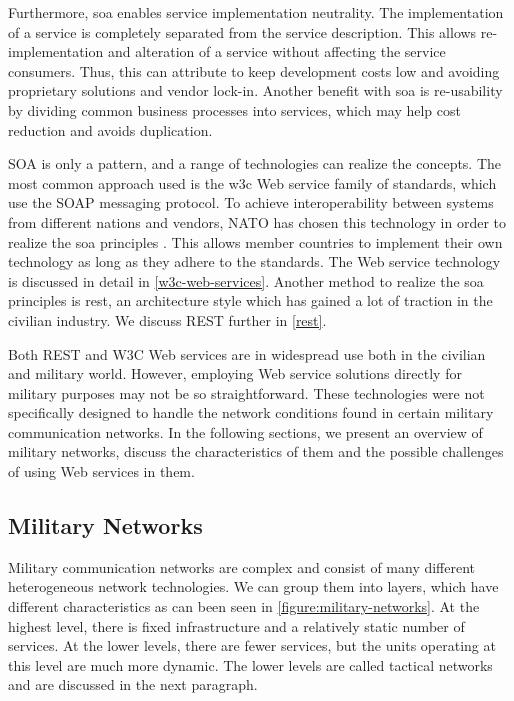 Furthermore, \gls{soa} enables service implementation neutrality. The
implementation of a service is completely separated from the service
description. This allows re-implementation and alteration of a service without
affecting the service consumers. Thus, this can attribute to keep development
costs low and avoiding proprietary solutions and vendor lock-in. Another
benefit with \gls{soa} is re-usability by dividing common business processes
into services, which may help cost reduction and avoids duplication.

SOA is only a pattern, and a range of technologies can realize the concepts. The
most common approach used is the \gls{w3c} Web service family of standards,
which use the SOAP messaging protocol. To achieve interoperability between
systems from different nations and vendors, NATO has chosen this technology in
order to realize the \gls{soa} principles \cite{soa-baseline}. This allows
member countries to implement their own technology as long as they adhere to the
standards. The Web service technology is discussed in detail in
\cref{w3c-web-services}. Another method to realize the \gls{soa} principles is
\gls{rest}, an architecture style which has gained a lot of traction in the
civilian industry. We discuss REST further in \cref{rest}.

Both REST and W3C Web services are in widespread use both in the civilian and
military world. However, employing Web service solutions directly for military
purposes may not be so straightforward. These technologies were not specifically
designed to handle the network conditions found in certain military
communication networks. In the following sections, we present an overview of
military networks, discuss the characteristics of them and the possible
challenges of using Web services in them.

\subsection{Military Networks}

Military communication networks are complex and consist of many different
heterogeneous network technologies. We can group them into layers, which have
different characteristics as can been seen in \cref{figure:military-networks}.
At the highest level, there is fixed infrastructure and a relatively static
number of services. At the lower levels, there are fewer services, but the units
operating at this level are much more dynamic. The lower levels are called
tactical networks and are discussed in the next paragraph.

